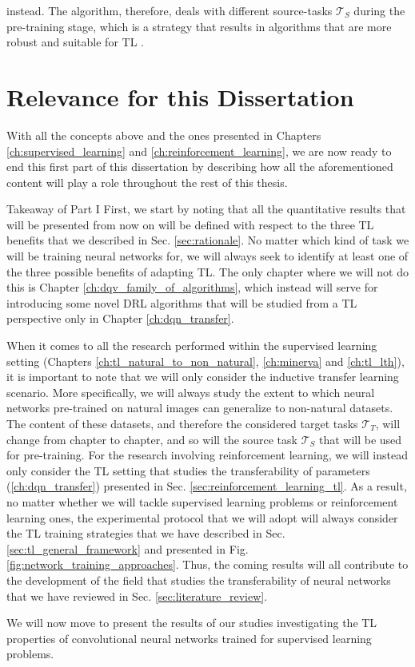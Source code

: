 instead. The algorithm, therefore, deals with different source-tasks $\mathcal{T}_S$ during the pre-training stage, which is a strategy that results in algorithms that are more robust and suitable for TL \cite{kirkpatrick2017overcoming}.  


\section{Relevance for this Dissertation}
\label{sec:relevance}

With all the concepts above and the ones presented in Chapters \ref{ch:supervised_learning} and \ref{ch:reinforcement_learning}, we are now ready to end this first part of this dissertation by describing how all the aforementioned content will play a role throughout the rest of this thesis. 


\begin{takeaway}{Takeaway of Part I}
First, we start by noting that all the quantitative results that will be presented from now on will be defined with respect to the three TL benefits that we described in Sec. \ref{sec:rationale}. No matter which kind of task we will be training neural networks for, we will always seek to identify at least one of the three possible benefits of adapting TL. The only chapter where we will not do this is Chapter \ref{ch:dqv_family_of_algorithms}, which instead will serve for introducing some novel DRL algorithms that will be studied from a TL perspective only in Chapter \ref{ch:dqn_transfer}.

When it comes to all the research performed within the supervised learning setting (Chapters \ref{ch:tl_natural_to_non_natural}, \ref{ch:minerva} and \ref{ch:tl_lth}), it is important to note that we will only consider the inductive transfer learning scenario. More specifically, we will always study the extent to which neural networks pre-trained on natural images can generalize to non-natural datasets. The content of these datasets, and therefore the considered target tasks $\mathcal{T}_T$, will change from chapter to chapter, and so will the source task $\mathcal{T}_S$ that will be used for pre-training. For the research involving reinforcement learning, we will instead only consider the TL setting that studies the transferability of parameters (\ref{ch:dqn_transfer}) presented in Sec. \ref{sec:reinforcement_learning_tl}. As a result, no matter whether we will tackle supervised learning problems or reinforcement learning ones, the experimental protocol that we will adopt will always consider the TL training strategies that we have described in Sec. \ref{sec:tl_general_framework} and presented in Fig. \ref{fig:network_training_approaches}. Thus, the coming results will all contribute to the development of the field that studies the transferability of neural networks that we have reviewed in Sec. \ref{sec:literature_review}.
\end{takeaway}

We will now move to present the results of our studies investigating the TL properties of convolutional neural networks trained for supervised learning problems.
